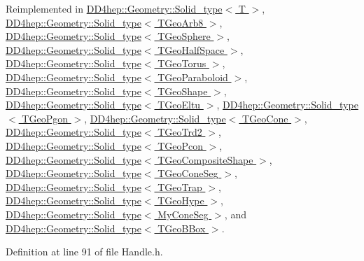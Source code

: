 Reimplemented in \hyperlink{class_d_d4hep_1_1_geometry_1_1_solid__type_a660e91d2703f947ad759fe0cbef3bbc6}{DD4hep::Geometry::Solid\_\-type$<$ T $>$}, \hyperlink{class_d_d4hep_1_1_geometry_1_1_solid__type_a660e91d2703f947ad759fe0cbef3bbc6}{DD4hep::Geometry::Solid\_\-type$<$ TGeoArb8 $>$}, \hyperlink{class_d_d4hep_1_1_geometry_1_1_solid__type_a660e91d2703f947ad759fe0cbef3bbc6}{DD4hep::Geometry::Solid\_\-type$<$ TGeoSphere $>$}, \hyperlink{class_d_d4hep_1_1_geometry_1_1_solid__type_a660e91d2703f947ad759fe0cbef3bbc6}{DD4hep::Geometry::Solid\_\-type$<$ TGeoHalfSpace $>$}, \hyperlink{class_d_d4hep_1_1_geometry_1_1_solid__type_a660e91d2703f947ad759fe0cbef3bbc6}{DD4hep::Geometry::Solid\_\-type$<$ TGeoTorus $>$}, \hyperlink{class_d_d4hep_1_1_geometry_1_1_solid__type_a660e91d2703f947ad759fe0cbef3bbc6}{DD4hep::Geometry::Solid\_\-type$<$ TGeoParaboloid $>$}, \hyperlink{class_d_d4hep_1_1_geometry_1_1_solid__type_a660e91d2703f947ad759fe0cbef3bbc6}{DD4hep::Geometry::Solid\_\-type$<$ TGeoShape $>$}, \hyperlink{class_d_d4hep_1_1_geometry_1_1_solid__type_a660e91d2703f947ad759fe0cbef3bbc6}{DD4hep::Geometry::Solid\_\-type$<$ TGeoEltu $>$}, \hyperlink{class_d_d4hep_1_1_geometry_1_1_solid__type_a660e91d2703f947ad759fe0cbef3bbc6}{DD4hep::Geometry::Solid\_\-type$<$ TGeoPgon $>$}, \hyperlink{class_d_d4hep_1_1_geometry_1_1_solid__type_a660e91d2703f947ad759fe0cbef3bbc6}{DD4hep::Geometry::Solid\_\-type$<$ TGeoCone $>$}, \hyperlink{class_d_d4hep_1_1_geometry_1_1_solid__type_a660e91d2703f947ad759fe0cbef3bbc6}{DD4hep::Geometry::Solid\_\-type$<$ TGeoTrd2 $>$}, \hyperlink{class_d_d4hep_1_1_geometry_1_1_solid__type_a660e91d2703f947ad759fe0cbef3bbc6}{DD4hep::Geometry::Solid\_\-type$<$ TGeoPcon $>$}, \hyperlink{class_d_d4hep_1_1_geometry_1_1_solid__type_a660e91d2703f947ad759fe0cbef3bbc6}{DD4hep::Geometry::Solid\_\-type$<$ TGeoCompositeShape $>$}, \hyperlink{class_d_d4hep_1_1_geometry_1_1_solid__type_a660e91d2703f947ad759fe0cbef3bbc6}{DD4hep::Geometry::Solid\_\-type$<$ TGeoConeSeg $>$}, \hyperlink{class_d_d4hep_1_1_geometry_1_1_solid__type_a660e91d2703f947ad759fe0cbef3bbc6}{DD4hep::Geometry::Solid\_\-type$<$ TGeoTrap $>$}, \hyperlink{class_d_d4hep_1_1_geometry_1_1_solid__type_a660e91d2703f947ad759fe0cbef3bbc6}{DD4hep::Geometry::Solid\_\-type$<$ TGeoHype $>$}, \hyperlink{class_d_d4hep_1_1_geometry_1_1_solid__type_a660e91d2703f947ad759fe0cbef3bbc6}{DD4hep::Geometry::Solid\_\-type$<$ MyConeSeg $>$}, and \hyperlink{class_d_d4hep_1_1_geometry_1_1_solid__type_a660e91d2703f947ad759fe0cbef3bbc6}{DD4hep::Geometry::Solid\_\-type$<$ TGeoBBox $>$}.

Definition at line 91 of file Handle.h.

